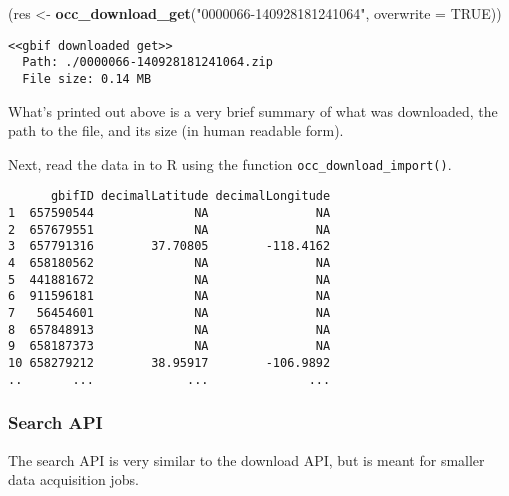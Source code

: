 \documentclass[author-year, review, 11pt]{components/elsarticle} %
\newenvironment{Shaded}{\begin{snugshade}}{\end{snugshade}}
\newcommand{\KeywordTok}[1]{\textcolor[rgb]{0.13,0.29,0.53}{\textbf{{#1}}}}
\newcommand{\DataTypeTok}[1]{\textcolor[rgb]{0.13,0.29,0.53}{{#1}}}
\newcommand{\StringTok}[1]{\textcolor[rgb]{0.31,0.60,0.02}{{#1}}}
\newcommand{\OtherTok}[1]{\textcolor[rgb]{0.56,0.35,0.01}{{#1}}}
\newcommand{\NormalTok}[1]{{#1}}
\begin{document}
\begin{Shaded}
\begin{Highlighting}[]
\NormalTok{(res <-}\StringTok{ }\KeywordTok{occ_download_get}\NormalTok{(}\StringTok{"0000066-140928181241064"}\NormalTok{, }\DataTypeTok{overwrite =} \OtherTok{TRUE}\NormalTok{))}
\end{Highlighting}
\end{Shaded}

\begin{verbatim}
<<gbif downloaded get>>
  Path: ./0000066-140928181241064.zip
  File size: 0.14 MB
\end{verbatim}

What's printed out above is a very brief summary of what was downloaded,
the path to the file, and its size (in human readable form).

Next, read the data in to R using the function
\texttt{occ\_download\_import()}.

\begin{Shaded}
\end{Shaded}

\begin{verbatim}
      gbifID decimalLatitude decimalLongitude
1  657590544              NA               NA
2  657679551              NA               NA
3  657791316        37.70805        -118.4162
4  658180562              NA               NA
5  441881672              NA               NA
6  911596181              NA               NA
7   56454601              NA               NA
8  657848913              NA               NA
9  658187373              NA               NA
10 658279212        38.95917        -106.9892
..       ...             ...              ...
\end{verbatim}

\subsubsection{Search API}\label{search-api}

The search API is very similar to the download API, but is meant for
smaller data acquisition jobs.
\end{document}
